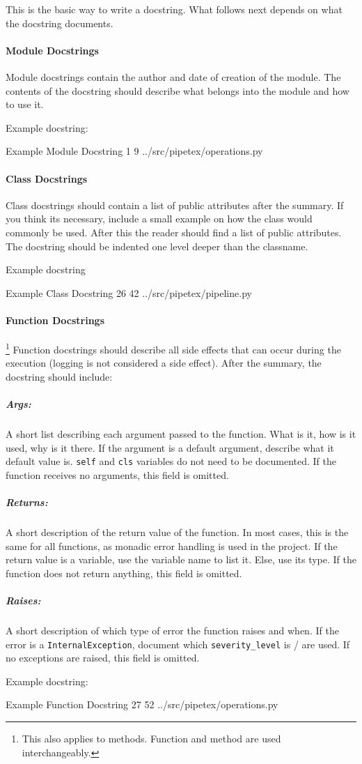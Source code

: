 This is the basic way to write a docstring. What follows next depends on what the
docstring documents.

\paragraph{Module Docstrings} Module docstrings contain the author and date of
creation of the module. The contents of the docstring should describe what belongs
into the module and how to use it.

Example docstring:

\codeexample
{Example Module Docstring}
{1}
{9}
{../src/pipetex/operations.py}

\paragraph{Class Docstrings} Class docstrings should contain a list of public
attributes after the summary. If you think its necessary, include a small 
example on how the class would commonly be used. After this the reader should
find a list of public attributes. The docstring should be indented one level
deeper than the classname.

Example docstring

\codeexample
{Example Class Docstring}
{26}
{42}
{../src/pipetex/pipeline.py}

\paragraph{Function Docstrings}\footnote{This also applies to methods. Function
and method are used interchangeably.} Function docstrings should describe all
side effects that can occur during the execution (logging is not considered a
side effect). After the summary, the docstring should include:

\subparagraph{Args:} A short list describing each argument passed to the
function.  What is it, how is it used, why is it there. If the argument is a
default argument, describe what it default value is. \verb|self| and \verb|cls|
variables do not need to be documented. If the function receives no arguments,
this field is omitted.

\subparagraph{Returns:} A short description of the return value of the
function.  In most cases, this is the same for all functions, as monadic error
handling is used in the project. If the return value is a variable, use the
variable name to list it. Else, use its type. If the function does not return
anything, this field is omitted.

\subparagraph{Raises:} A short description of which type of error the function
raises and when. If the error is a \verb|InternalException|, document which 
\verb|severity_level| is / are used. If no exceptions are raised, this field is
omitted.

Example docstring:

\codeexample
{Example Function Docstring}
{27}
{52}
{../src/pipetex/operations.py}

